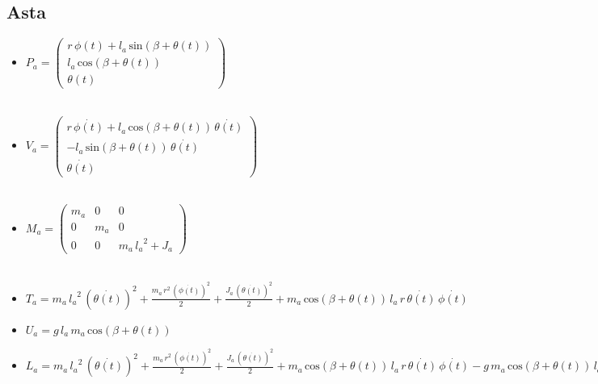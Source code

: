 \subsection{Asta}
\begin{itemize}
	
	\item \textbf{$P_a = \left(\begin{array}{c}
		r\,\phi \left(t\right)+l_a \,\mathrm{sin}\left(\beta +\theta \left(t\right)\right)\\
		l_a \,\mathrm{cos}\left(\beta +\theta \left(t\right)\right)\\
		\theta \left(t\right)
		\end{array}\right)$}
	\\\\
	\item \textbf{$V_a = \left(\begin{array}{c}
		r\,\dot{\phi \left(t\right)}+l_a \,\mathrm{cos}\left(\beta +\theta \left(t\right)\right)\,\dot{\theta \left(t\right)}\\
		-l_a \,\mathrm{sin}\left(\beta +\theta \left(t\right)\right)\,\dot{\theta \left(t\right)}\\
		\dot{\theta \left(t\right)}
		\end{array}\right)$}
	\\\\
	\item \textbf{$M_a = \left(\begin{array}{ccc}
		m_a  & 0 & 0\\
		0 & m_a  & 0\\
		0 & 0 & m_a \,{l_a }^2 +J_a 
		\end{array}\right)$}
	\\\\
	\item \textbf{$T_a = m_a \,{l_a }^2 \,{{\left(\dot{\theta \left(t\right)}\right)}}^2 +\frac{m_a \,r^2 \,{{\left(\dot{\phi \left(t\right)}\right)}}^2 }{2}+\frac{J_a \,{{\left(\dot{\theta \left(t\right)}\right)}}^2 }{2}+m_a \,\mathrm{cos}\left(\beta +\theta \left(t\right)\right)\,l_a \,r\,\dot{\theta \left(t\right)}\,\dot{\phi \left(t\right)}$}
	\\
	\item \textbf{$U_a = g\,l_a \,m_a \,\mathrm{cos}\left(\beta +\theta \left(t\right)\right)$}
	\\
	\item \textbf{$L_a = m_a \,{l_a }^2 \,{{\left(\dot{\theta \left(t\right)}\right)}}^2 +\frac{m_a \,r^2 \,{{\left(\dot{\phi \left(t\right)}\right)}}^2 }{2}+\frac{J_a \,{{\left(\dot{\theta \left(t\right)}\right)}}^2 }{2}+m_a \,\mathrm{cos}\left(\beta +\theta \left(t\right)\right)\,l_a \,r\,\dot{\theta \left(t\right)}\,\dot{\phi \left(t\right)}-g\,m_a \,\mathrm{cos}\left(\beta +\theta \left(t\right)\right)\,l_a$}
\end{itemize}
\newpage
